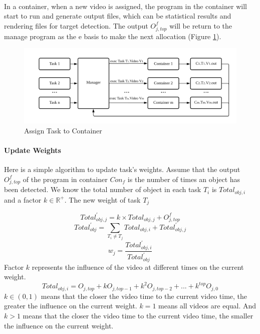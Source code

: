 \documentclass{article}
\begin{document}
                \paragraph{}
                In a container, when a new video is assigned, the program in the container will start to run and generate output files, which can be statistical results and rendering files for target detection. The output $O_{j,top}^f$ will be return to the manage program as the e basis to make the next allocation (Figure \ref{img3}).
                \begin{figure}[H]
                    \centering
                    \includegraphics[width=01\textwidth]{img/report3.png}
                    \caption{Assign Task to Container}
                    \label{img3} 
                \end{figure}
                \paragraph{Update Weights}
                Here is a simple algorithm to update task's weights. Assume that the output $O_{j,top}^f$ of the program in container $Con_f$ is the number of times an object has been detected. We know the total number of object in each task $T_i$ is $Total_{obj,i}$ and a factor $k\in \mathbb{R}^+$. The new weight of task $T_j$

                $$Total_{obj,j}^{'}=k\times Total_{obj,j}+O_{j,top}^f$$
                $$Total_{obj}^{'}=\sum_{T_i\neq T_j} Total_{obj,i}+Total_{obj,j}^{'}$$
                $$w_j=\frac{Total_{obj,i}^{'}}{Total_{obj}^{'}}$$
                Factor $k$ represents the influence of the video at different times on the current weight.
                $$Total_{obj,i}=O_{j,top}+kO_{j,top-1}+k^2O_{j,top-2}+...+k^{top}O_{j,0}$$ 
                $k\in (0,1)$ means that the closer the video time to the current video time, the greater the influence on the current weight. $k=1$ means all videos are equal. And $k>1$ means that the closer the video time to the current video time, the smaller the influence on the current weight.
\end{document}
